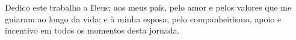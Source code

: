 \begin{dedicatoria}
   \vspace*{\fill}
   \centering
   \noindent
    Dedico este trabalho a Deus; aos meus pais, pelo amor e pelos valores que me guiaram ao longo da vida; e à minha esposa, pelo companheirismo, apoio e incentivo em todos os momentos desta jornada.
\end{dedicatoria}